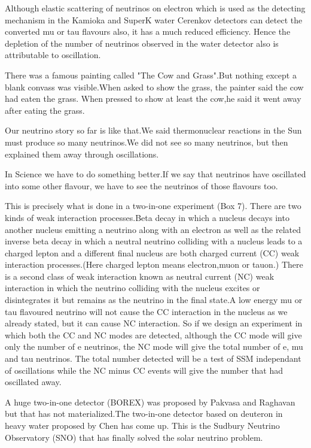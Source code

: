 Although elastic scattering of neutrinos on electron which
is used as the detecting mechanism in the Kamioka and SuperK
water Cerenkov detectors can detect the converted mu or tau
flavours also, it has a much reduced efficiency. Hence the
depletion of the number of neutrinos observed in the water
detector also is attributable to oscillation.

There was a famous painting called "The Cow and Grass".But
nothing except a blank convass was visible.When asked to
show the grass, the painter said the cow had eaten the grass.
When pressed to show at least the cow,he said it went away
after eating the grass.

Our neutrino story so far is like that.We said thermonuclear reactions
in the Sun must produce so many neutrinos.We did not see so
many neutrinos, but then explained them away through oscillations.

In Science we have to do something better.If we say that neutrinos have
oscillated into some other flavour, we have to see the
neutrinos of those flavours too.

This is precisely what is done in a two-in-one experiment (Box 7).
There are two kinds of weak interaction processes.Beta decay
in which a nucleus decays into another nucleus emitting a
neutrino along with an electron as well as the related
inverse beta decay in which a neutral neutrino colliding
with a nucleus leads to a charged lepton and a different
final nucleus are both charged current (CC) weak interaction
processes.(Here charged lepton means electron,muon or tauon.)
There is a second class of weak interaction known as neutral
current (NC) weak interaction in which the neutrino colliding
with the nucleus excites or disintegrates it but remains as
the neutrino in the final state.A low energy mu or tau
flavoured neutrino will not cause the CC interaction in
the nucleus as we already stated, but it can cause NC interaction.
So if we design an experiment in which both the CC and NC modes
are detected, although the CC mode will give only the number
of e neutrinos, the NC mode will give the total number of e, mu and
tau neutrinos. The total number detected will be a test of
SSM independant of oscillations while the NC minus CC events
will give the number that had oscillated away.

A huge two-in-one detector (BOREX) was proposed by Pakvasa and
Raghavan but that has not materialized.The two-in-one detector
based on deuteron in heavy water proposed by Chen has come up.
This is the Sudbury Neutrino Observatory (SNO) that has finally
solved the solar neutrino problem.

